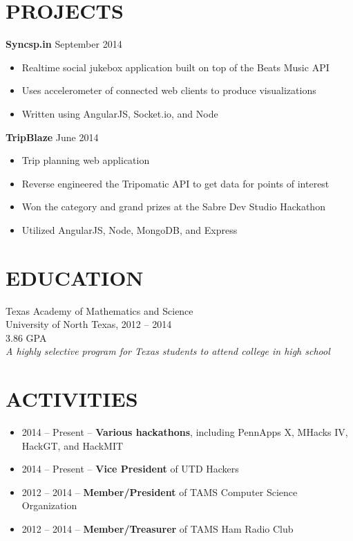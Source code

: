 \documentclass[margin, 10pt]{res} %
\begin{document}
\begin{resume}
  \section{PROJECTS}

  \textbf{Syncsp.in} \hfill September 2014

  \begin{itemize} \itemsep -2pt
    \item Realtime social jukebox application built on top of the Beats Music API
    \item Uses accelerometer of connected web clients to produce visualizations
    \item Written using AngularJS, Socket.io, and Node
  \end{itemize}

  \textbf{TripBlaze} \hfill June 2014

  \begin{itemize} \itemsep -2pt
    \item Trip planning web application
    \item Reverse engineered the Tripomatic API to get data for points of interest
    \item Won the category and grand prizes at the Sabre Dev Studio Hackathon
    \item Utilized AngularJS, Node, MongoDB, and Express
  \end{itemize}

  \section{EDUCATION}

  Texas Academy of Mathematics and Science \\
  University of North Texas, 2012 -- 2014 \\
  3.86 GPA \\
  \textit {A highly selective program for Texas students to attend college in high school}


  \section{ACTIVITIES} 

  \begin{itemize} \itemsep -2pt
    \item 2014 -- Present -- \textbf{Various hackathons}, including PennApps X, MHacks IV, HackGT, and HackMIT
    \item 2014 -- Present -- \textbf{Vice President} of UTD Hackers
    \item 2012 -- 2014 -- \textbf{Member/President} of TAMS Computer Science Organization
    \item 2012 -- 2014 -- \textbf{Member/Treasurer} of TAMS Ham Radio Club
  \end{itemize}

\end{resume}
\end{document}
